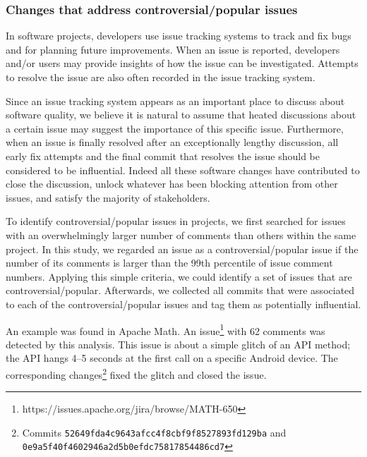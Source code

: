 \subsubsection{Changes that address controversial/popular issues}
\label{sec:blocking}
In software projects, developers use issue tracking systems
to track and fix bugs and for planning
future improvements. When an issue is reported, developers and/or
users may provide insights of how the issue can be investigated. 
Attempts to resolve the issue are also often recorded in the issue tracking
system.

Since an issue tracking system appears as an important place to discuss
about software quality, we believe it is natural to assume that heated
discussions about a certain issue may suggest the importance of this
specific issue. Furthermore, when an issue is finally resolved after an exceptionally
lengthy discussion, all early fix attempts and the final commit that resolves
the issue should be considered to be influential. Indeed all these
software changes have contributed to close the discussion, unlock whatever
has been blocking attention from other issues, and satisfy the majority of
stakeholders. 

To identify controversial/popular issues in projects, we first searched for
issues with an overwhelmingly larger number of comments than others within the
same project. In this study, we regarded an issue as a controversial/popular issue if the
number of its comments is larger than the 99th percentile of issue comment
numbers. Applying this simple criteria, we could identify a set of issues that
 are controversial/popular. Afterwards, we collected all commits that were
associated to each of the controversial/popular issues and tag them as potentially
influential.



An example was found in Apache Math. An
issue\footnote{\small https://issues.apache.org/jira/browse/MATH-650} with 62
comments was detected by this analysis. This issue is about a simple glitch of
an API method; the API hangs 4--5 seconds at the first call on a specific
Android device. The corresponding
changes\footnote{Commits {\tt\small 52649fda4c9643afcc4f8cbf9f8527893fd129ba} and\\
{\tt\small 0e9a5f40f4602946a2d5b0efdc75817854486cd7}} fixed the glitch and
closed the issue.


